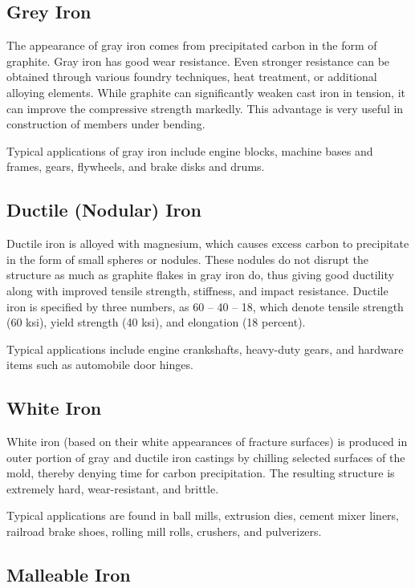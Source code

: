 \documentclass[
10pt,
a4paper,
openany,
svgnames,
]{book}
\begin{document}
\subsection{Grey Iron}

The appearance of gray iron comes from precipitated carbon in the form of graphite. Gray iron has good wear resistance. Even stronger resistance can be obtained through various foundry techniques, heat treatment, or additional alloying elements. While graphite can significantly weaken cast iron in tension, it can improve the compressive strength markedly. This advantage is very useful in construction of members under bending.

Typical applications of gray iron include engine blocks, machine bases and frames, gears, flywheels, and brake disks and drums.

\subsection{Ductile (Nodular) Iron}

Ductile iron is alloyed with magnesium, which causes excess carbon to precipitate in the form of small spheres or nodules. These nodules do not disrupt the structure as much as graphite flakes in gray iron do, thus giving good ductility along with improved tensile strength, stiffness, and impact resistance. Ductile iron is specified by three numbers, as 60 – 40 – 18, which denote tensile strength (60 ksi), yield strength (40 ksi), and elongation (18 percent).

Typical applications include engine crankshafts, heavy-duty gears, and hardware items such as automobile door hinges.

\subsection{White Iron}

White iron (based on their white appearances of fracture surfaces) is produced in outer portion of gray and ductile iron castings by chilling selected surfaces of the mold, thereby denying time for carbon precipitation. The resulting structure is extremely hard, wear-resistant, and brittle.

Typical applications are found in ball mills, extrusion dies, cement mixer liners, railroad brake shoes, rolling mill rolls, crushers, and pulverizers.

\subsection{Malleable Iron}
\end{document}
